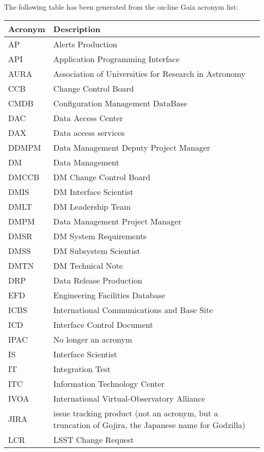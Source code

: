 The following table has been generated from the on-line Gaia acronym list:
\newline\newline%
\addtocounter{table}{-1}
\begin{longtable}{|l|p{}|}\hline
\textbf{Acronym} & \textbf{Description}  \\\hline
AP&Alerts Production \\\hline
API&Application Programming Interface \\\hline
AURA&Association of Universities for Research in Astronomy \\\hline
CCB&Change Control Board \\\hline
CMDB&Configuration Management DataBase \\\hline
DAC&Data Access Center \\\hline
DAX&Data access services \\\hline
DDMPM&Data Management Deputy Project Manager \\\hline
DM&Data Management \\\hline
DMCCB&DM Change Control Board \\\hline
DMIS&DM Interface Scientist \\\hline
DMLT&DM Leadership Team \\\hline
DMPM&Data Management Project Manager \\\hline
DMSR&DM System Requirements \\\hline
DMSS&DM Subsystem Scientist \\\hline
DMTN&DM Technical Note \\\hline
DRP&Data Release Production \\\hline
EFD&Engineering Facilities Database \\\hline
ICBS&International Communications and Base Site \\\hline
ICD&Interface Control Document \\\hline
IPAC&No longer an acronym \\\hline
IS&Interface Scientist \\\hline
IT&Integration Test \\\hline
ITC&Information Technology Center \\\hline
IVOA&International Virtual-Observatory Alliance \\\hline
JIRA&issue tracking product (not an acronym, but a truncation of Gojira, the Japanese name for Godzilla) \\\hline
LCR&LSST Change Request \\\hline

\end{longtable}
